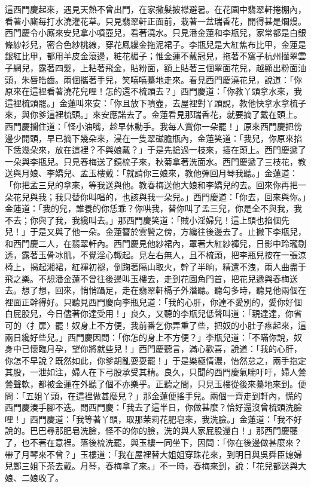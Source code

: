 \begin{showcontents}{}
這西門慶起來，遇見天熱不曾出門，在家撒髮披襟避暑。在花園中翡翠軒捲棚內，看著小廝每打水澆灌花草。只見翡翠軒正面前，栽著一盆瑞香花，開得甚是爛熳。西門慶令小廝來安兒拿小噴壺兒，看著澆水。只見潘金蓮和李瓶兒，家常都是白銀條紗衫兒，密合色紗桃線，穿花鳳縷金拖泥裙子。李瓶兒是大紅焦布比甲，金蓮是銀紅比甲，都用羊皮金滾邊，粧花楣子；惟金蓮不戴冠兒，拖著不窩子杭州攆翠雲子網兒，露著四髮，上粘著飛金，貼粉面，額上貼著三個翠面花兒，越顯出粉面油頭，朱唇皓齒。兩個攜著手兒，笑嘻嘻驀地走來。看見西門慶澆花兒，說道：「你原來在這裡看著澆花兒哩！怎的還不梳頭去？」西門慶道：「你教丫頭拿水來，我這裡梳頭罷。」金蓮叫來安：「你且放下噴壺，去屋裡對丫頭說，教他快拿水拿梳子來，與你爹這裡梳頭。」來安應諾去了。金蓮看見那瑞香花，就要摘了戴在頭上。西門慶攔住道：「怪小油嘴，趁早休動手。我每人賞你一朵罷！」原來西門慶把傍邊少開頭，早已摘下幾朵來，浸在一隻翠磁膽瓶內，金蓮笑道：「我兒，你原來掐下恁幾朵來，放在這裡？不與娘戴？」于是先搶過一枝來，插在頭上。西門慶遞了一朵與李瓶兒。只見春梅送了鏡梳子來，秋菊拿著洗面水。西門慶遞了三枝花，教送與月娘、李嬌兒、孟玉樓戴：「就請你三娘來，教他彈回月琴我聽。」金蓮道：「你把孟三兒的拿來，等我送與他。教春梅送他大娘和李嬌兒的去。回來你再把一朵花兒與我；我只替你叫唱的，也該與我一朵兒。」西門慶道：「你去，回來與你。」金蓮道：「我的兒，誰養的你恁乖？你哄我，替你叫了孟三兒，你是全不與我，我不去；你與了我，我纔叫去。」那西門慶笑道：「賊小淫婦兒！這上頭也掐個先兒！」于是又與了他一朵。金蓮簪於雲鬢之傍，方纔往後邊去了。止撇下李瓶兒，和西門慶二人，在翡翠軒內。西門慶見他紗裙內，罩著大紅紗褲兒，日影中玲瓏剔透，露著玉骨冰肌，不覺淫心輙起。見左右無人，且不梳頭，把李瓶兒按在一張涼椅上，揭起湘裙，紅褌初褪，倒踘著隔山取火，幹了半晌，精還不洩，兩人曲盡于飛之樂。不想潘金蓮不曾往後邊叫玉樓去，走到花園角門首，把花兒遞與春梅送去。想了想，回來，悄悄躡足，走在翡翠軒槅子外潛聽。聽勾多時，聽見他兩個在裡面正幹得好。只聽見西門慶向李瓶兒道：「我的心肝，你達不愛別的，愛你好個白屁股兒，今日儘著你達受用！」良久，又聽的李瓶兒低聲叫道：「親達達，你省可的〈扌扉〉罷！奴身上不方便，我前番乞你弄重了些，把奴的小肚子疼起來，這兩日纔好些兒。」西門慶因問：「你怎的身上不方便？」李瓶兒道：「不瞞你說，奴身中已懷臨月孕，望你將就些兒！」西門慶聽言，滿心歡喜，說道：「我的心肝，你怎不早說？既然如此，你爹胡亂耍耍罷！」于是樂極情濃，怡然怠之，兩手抱定其股，一泄如注，婦人在下弓股承受其精。良久，只聞的西門慶氣喘吁吁，婦人鶯鶯聲軟，都被金蓮在外聽了個不亦樂乎。正聽之間，只見玉樓從後來驀地來到。便問：「五姐丫頭，在這裡做甚麼兒？」那金蓮便搖手兒。兩個一齊走到軒內，慌的西門慶湊手腳不迭。問西門慶：「我去了這半日，你做甚麼？恰好還沒曾梳頭洗臉哩！」西門慶道：「我等著丫頭，取那茉莉花肥皂來，我洗臉。」金蓮道：「我不好說的。巴巴尋那肥皂洗臉，怪不的你的臉，洗的與人家屁股還白！」那西門慶聽了，也不著在意裡。落後梳洗罷，與玉樓一同坐下，因問：「你在後邊做甚麼來？帶了月琴來不曾？」玉樓道：「我在屋裡替大姐姐穿珠花來，到明日與吳舜臣媳婦兒鄭三姐下茶去戴。月琴，春梅拿了來。」不一時，春梅來到，說：「花兒都送與大娘、二娘收了。
\end{showcontents}

